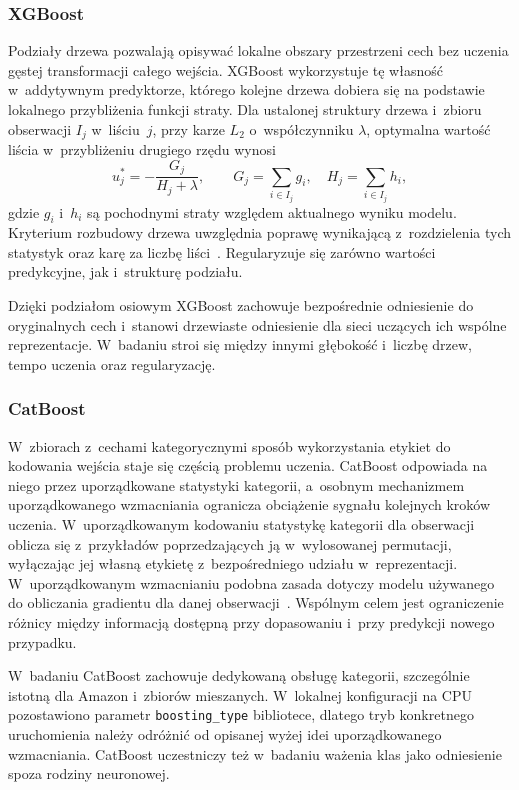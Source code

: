 \subsubsection{XGBoost}
\label{sec:xgboost}

Podziały drzewa pozwalają opisywać lokalne obszary przestrzeni cech bez uczenia gęstej transformacji całego wejścia. XGBoost wykorzystuje tę własność w~addytywnym predyktorze, którego kolejne drzewa dobiera się na podstawie lokalnego przybliżenia funkcji straty. Dla ustalonej struktury drzewa i~zbioru obserwacji $I_j$ w~liściu~$j$, przy karze $L_2$ o~współczynniku $\lambda$, optymalna wartość liścia w~przybliżeniu drugiego rzędu wynosi
\begin{equation}
u_j^*=-\frac{G_j}{H_j+\lambda},\qquad
G_j=\sum_{i\in I_j}g_i,\quad H_j=\sum_{i\in I_j}h_i,
\label{eq:xgb-lisc}
\end{equation}
gdzie $g_i$ i~$h_i$ są pochodnymi straty względem aktualnego wyniku modelu. Kryterium rozbudowy drzewa uwzględnia poprawę wynikającą z~rozdzielenia tych statystyk oraz karę za liczbę liści~\cite{chen2016xgboost}. Regularyzuje się zarówno wartości predykcyjne, jak i~strukturę podziału.

Dzięki podziałom osiowym XGBoost zachowuje bezpośrednie odniesienie do oryginalnych cech i~stanowi drzewiaste odniesienie dla sieci uczących ich wspólne reprezentacje. W~badaniu stroi się między innymi głębokość i~liczbę drzew, tempo uczenia oraz regularyzację.

\subsubsection{CatBoost}
\label{sec:catboost}

W~zbiorach z~cechami kategorycznymi sposób wykorzystania etykiet do kodowania wejścia staje się częścią problemu uczenia. CatBoost odpowiada na niego przez uporządkowane statystyki kategorii, a~osobnym mechanizmem uporządkowanego wzmacniania ogranicza obciążenie sygnału kolejnych kroków uczenia. W~uporządkowanym kodowaniu statystykę kategorii dla obserwacji oblicza się z~przykładów poprzedzających ją w~wylosowanej permutacji, wyłączając jej własną etykietę z~bezpośredniego udziału w~reprezentacji. W~uporządkowanym wzmacnianiu podobna zasada dotyczy modelu używanego do obliczania gradientu dla danej obserwacji~\cite{prokhorenkova2018catboost}. Wspólnym celem jest ograniczenie różnicy między informacją dostępną przy dopasowaniu i~przy predykcji nowego przypadku.

W~badaniu CatBoost zachowuje dedykowaną obsługę kategorii, szczególnie istotną dla Amazon i~zbiorów mieszanych. W~lokalnej konfiguracji na CPU pozostawiono parametr \texttt{boosting\_type} bibliotece, dlatego tryb konkretnego uruchomienia należy odróżnić od opisanej wyżej idei uporządkowanego wzmacniania. CatBoost uczestniczy też w~badaniu ważenia klas jako odniesienie spoza rodziny neuronowej.

